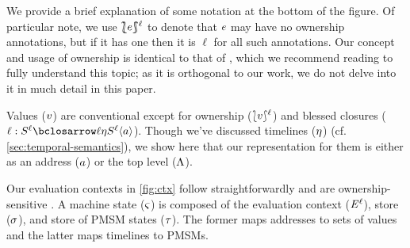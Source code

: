 %
\NB We provide a brief explanation of some notation at the bottom of the figure.
%
Of particular note, we use $\sOwn{\mexp}{\mmlab}$ to denote that $e$ may have no ownership annotations, but if it has one then it is $\ell$ for all such annotations.
%
Our concept and usage of ownership is identical to that of \citet{ianjohnson:dthf:complete}, which we recommend reading to fully understand this topic; as it is orthogonal to our work, we do not delve into it in much detail in this paper.
%

%
Values ($v$) are conventional except for ownership ($\lbag v\rbag^{\ell}$) and blessed closures ($\bclos{\mmlab}{\mscon}{\mmlab}{\mmlab}{\mtimeline}{\mscon}{\mmlab}{\maddr}$).
%
Though we've discussed timelines ($\eta$) (cf. \autoref{sec:temporal-semantics}), we show here that our representation for them is either as an address ($a$) or the top level ($\Lambda$).
%

%
Our evaluation contexts in \autoref{fig:ctx} follow straightforwardly and are ownership-sensitive \cite{ianjohnson:dthf:complete}.
%
A machine state ($\varsigma$) is composed of the evaluation context ($\mathit{E}^{\ell}$), store ($\sigma$), and store of PMSM states ($\tau$).
%
The former maps addresses to sets of values and the latter maps timelines to PMSMs.
%

